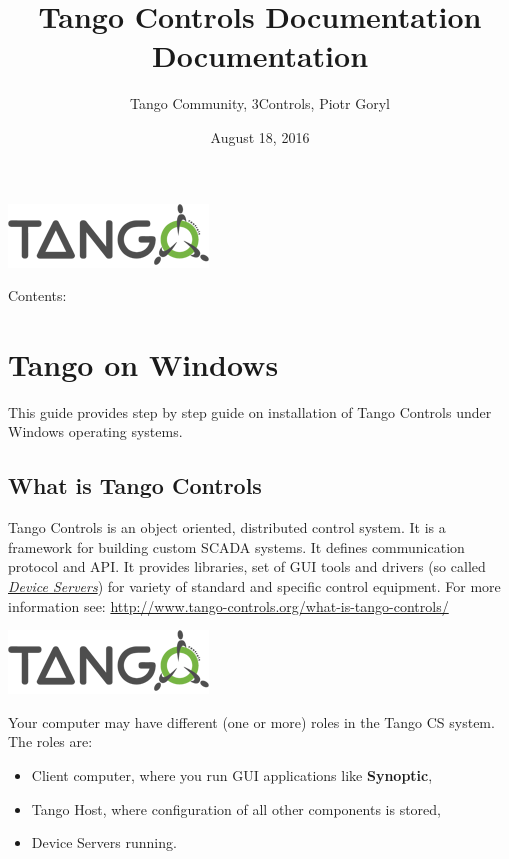 \documentclass[letterpaper,10pt,english]{sphinxmanual}
\title{Tango Controls Documentation Documentation}
\date{August 18, 2016}
\author{Tango Community, 3Controls, Piotr Goryl}
\begin{document}
\maketitle
\tableofcontents
{}\label{index::doc}
{\hfill\includegraphics{logo_tangocontrols.png}\hfill}



Contents:


\chapter{Tango on Windows}
\label{tango-on-windows:tango-on-windows}\label{tango-on-windows::doc}\label{tango-on-windows:welcome-to-tango-controls-documentation}
This guide provides step by step guide on installation of Tango Controls under Windows operating systems.


\section{What is Tango Controls}
\label{tango-on-windows:what-is-tango-controls}
Tango Controls is an object oriented, distributed control system. It is a framework for building custom SCADA systems.
It defines communication protocol and API. It provides libraries, set of GUI tools and drivers (so called
{\hyperref[glossary:term-device-servers]{\emph{Device Servers}}}) for variety of standard and specific control equipment. For more information see:
\href{http://www.tango-controls.org/what-is-tango-controls/}{http://www.tango-controls.org/what-is-tango-controls/}

{\hfill\includegraphics{logo_tangocontrols.png}\hfill}

Your computer may have different (one or more) roles in the Tango CS system. The roles are:
\begin{itemize}
\item {} 
Client computer, where you run GUI applications like \textbf{Synoptic},

\item {} 
Tango Host, where configuration of all other components is stored,

\item {} 
Device Servers running.

\end{itemize}
\end{document}
